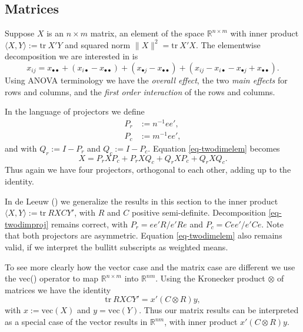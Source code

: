 \documentclass[
  12pt,
  letterpaper,
  DIV=11,
  numbers=noendperiod]{scrartcl}
\begin{document}
\subsection{Matrices}\label{matrices}

Suppose \(X\) is an \(n\times m\) matrix, an element of the space
\(\mathbb{R}^{n\times m}\) with inner product
\(\langle X,Y\rangle:=\text{tr}\ X'Y\) and squared norm
\(\|X\|^2=\text{tr}\ X'X\). The elementwise decomposition we are
interested in is \begin{equation}
x_{ij}=x_{\bullet\bullet}+(x_{i\bullet}-x_{\bullet\bullet})+(x_{\bullet j}-x_{\bullet\bullet})+
(x_{ij}-x_{i\bullet}-x_{\bullet j}+x_{\bullet\bullet}).\label{eq-twodimelem}
\end{equation} Using ANOVA terminology we have the \emph{overall
effect}, the two \emph{main effects} for rows and columns, and the
\emph{first order interaction} of the rows and columns.

In the language of projectors we define \begin{subequations}
\begin{align}
P_r&:=n^{-1}ee',\\
P_c&:=m^{-1}ee',
\end{align}
\end{subequations} and with \(Q_r:=I-P_r\) and \(Q_c:=I-P_c\). Equation
\eqref{eq-twodimelem} becomes \begin{equation}
X=P_rXP_c+P_rXQ_c+Q_rXP_c+Q_rXQ_c.\label{eq-twodimproj}
\end{equation} Thus again we have four projectors, orthogonal to each
other, adding up to the identity.

In {de Leeuw} () we generalize the
results in this section to the inner product
\(\langle X,Y\rangle:=\text{tr}\ RXCY'\), with \(R\) and \(C\) positive
semi-definite. Decomposition \eqref{eq-twodimproj} remains correct, with
\(P_r=ee'R/e'Re\) and \(P_c=Cee'/e'Ce\). Note that both projectors are
asymmetric. Equation \eqref{eq-twodimelem} also remains valid, if we
interpret the bullitt subscripts as weighted means.

To see more clearly how the vector case and the matrix case are
different we use the vec() operator to map \(\mathbb{R}^{n\times m}\)
into \(\mathbb{R}^{nm}\). Using the Kronecker product \(\otimes\) of
matrices we have the identity \begin{equation}
\text{tr}\ RXCY'=x'(C\otimes R)y,
\end{equation} with \(x:=\text{vec}(X)\) and \(y=\text{vec}(Y)\). Thus
our matrix results can be interpreted as a special case of the vector
results in \(\mathbb{R}^{nm}\), with inner product \(x'(C\otimes R)y\).
\end{document}
